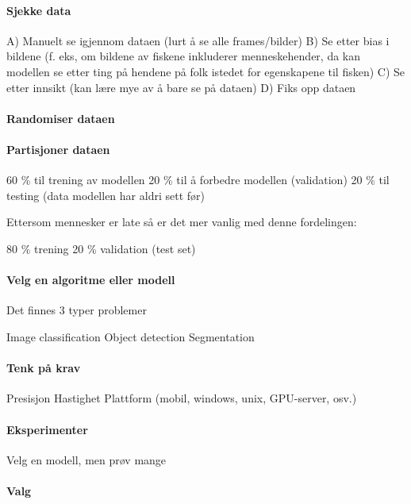 \paragraph{Sjekke data}

A) Manuelt se igjennom dataen (lurt å se alle frames/bilder)
B) Se etter bias i bildene (f. eks, om bildene av fiskene inkluderer menneskehender, da kan modellen se etter ting på hendene på folk istedet for egenskapene til fisken)
C) Se etter innsikt (kan lære mye av å bare se på dataen)
D) Fiks opp dataen

\paragraph{Randomiser dataen}

\paragraph{Partisjoner dataen}

60 \% til trening av modellen
20 \% til å forbedre modellen (validation)
20 \% til testing (data modellen har aldri sett før)

Ettersom mennesker er late så er det mer vanlig med denne fordelingen:

80 \% trening
20 \% validation (test set)

\paragraph{Velg en algoritme eller modell}

Det finnes 3 typer problemer

Image classification
Object detection
Segmentation

\paragraph{Tenk på krav}

Presisjon
Hastighet
Plattform (mobil, windows, unix, GPU-server, osv.)

\paragraph{Eksperimenter}

Velg en modell, men prøv mange

\paragraph{Valg}

